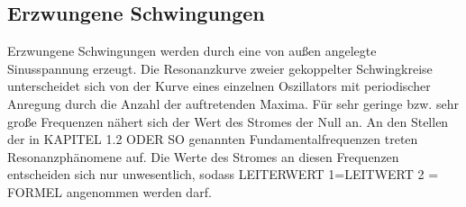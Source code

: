 \subsection{Erzwungene Schwingungen}

Erzwungene Schwingungen werden durch eine von außen angelegte Sinusspannung erzeugt. Die Resonanzkurve zweier gekoppelter Schwingkreise unterscheidet sich von der Kurve eines einzelnen Oszillators mit periodischer Anregung durch die Anzahl der auftretenden Maxima. Für sehr geringe bzw. sehr große Frequenzen nähert sich der Wert des Stromes der Null an. An den Stellen der in KAPITEL 1.2 ODER SO genannten Fundamentalfrequenzen treten Resonanzphänomene auf. Die Werte des Stromes an diesen Frequenzen entscheiden sich nur unwesentlich, sodass LEITERWERT 1=LEITWERT 2 = FORMEL  angenommen werden darf.
